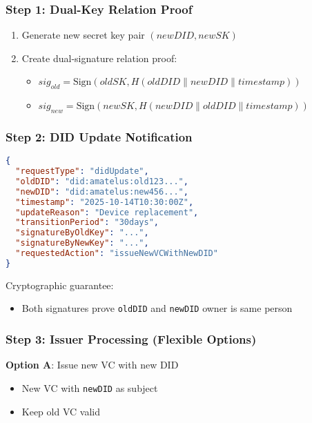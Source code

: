 \subsubsection{Step 1: Dual-Key Relation Proof}

\begin{enumerate}
  \item Generate new secret key pair $(newDID, newSK)$
  \item Create dual-signature relation proof:
    \begin{itemize}
      \item $sig_{old} = \text{Sign}(oldSK, H(oldDID \parallel newDID \parallel timestamp))$
      \item $sig_{new} = \text{Sign}(newSK, H(newDID \parallel oldDID \parallel timestamp))$
    \end{itemize}
\end{enumerate}

\subsubsection{Step 2: DID Update Notification}

\begin{lstlisting}[language=json]
{
  "requestType": "didUpdate",
  "oldDID": "did:amatelus:old123...",
  "newDID": "did:amatelus:new456...",
  "timestamp": "2025-10-14T10:30:00Z",
  "updateReason": "Device replacement",
  "transitionPeriod": "30days",
  "signatureByOldKey": "...",
  "signatureByNewKey": "...",
  "requestedAction": "issueNewVCWithNewDID"
}
\end{lstlisting}

Cryptographic guarantee:
\begin{itemize}
  \item Both signatures prove \texttt{oldDID} and \texttt{newDID} owner is same person
\end{itemize}

\subsubsection{Step 3: Issuer Processing (Flexible Options)}

\textbf{Option A}: Issue new VC with new DID
\begin{itemize}
  \item New VC with \texttt{newDID} as subject
  \item Keep old VC valid
\end{itemize}

